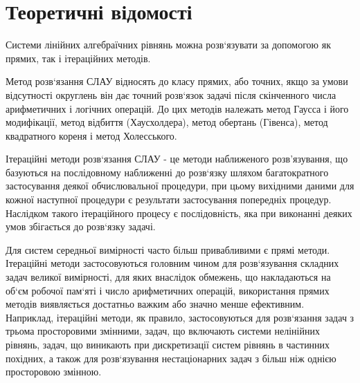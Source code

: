 \documentclass{report}
\begin{document}
\section*{Теоретичні відомості}
	Системи лінійних алгебраїчних рівнянь можна розв‘язувати за допомогою як прямих, так і ітераційних методів.\par
	Метод розв‘язання СЛАУ відносять до класу прямих, або точних, якщо за умови відсутності округлень він дає точний розв‘язок задачі після скінченного числа арифметичних і логічних операцій. До цих методів належать метод Гаусса і його модифікації, метод відбиття (Хаусхолдера), метод обертань (Гівенса), метод квадратного кореня і метод Холесського.\par
	Ітераційні методи розв‘язання СЛАУ - це методи наближеного \linebreak розв'язування, що базуються на послідовному наближенні до розв‘язку шляхом багатократного застосування деякої обчислювальної процедури, при цьому вихідними даними для кожної наступної процедури є результати застосування попередніх процедур. Наслідком такого ітераційного процесу є послідовність, яка при виконанні деяких умов збігається до розв‘язку задачі.\par
	Для систем середньої вимірності часто більш привабливими є прямі методи. Ітераційні методи застосовуються головним чином для розв‘язування складних задач великої вимірності, для яких внаслідок обмежень, що накладаються на об‘єм робочої пам‘яті і число арифметичних операцій, використання прямих методів виявляється достатньо важким або значно менше ефективним. Наприклад, ітераційні методи, як правило, застосовуються для розв‘язання задач з трьома просторовими змінними, задач, що включають системи нелінійних рівнянь, задач, що виникають при дискретизації систем рівнянь в частинних похідних, а також для розв‘язування нестаціонарних задач з більш ніж однією просторовою змінною.\par
\end{document}
